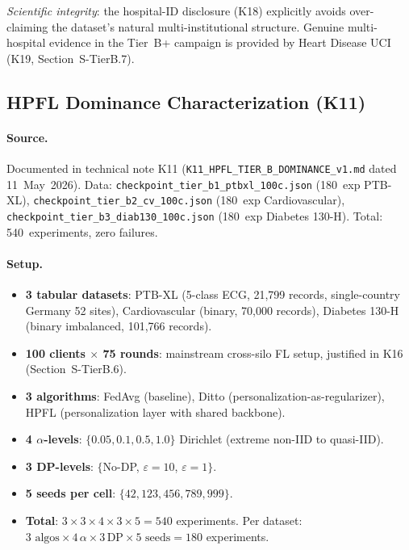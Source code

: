 \documentclass[conference]{IEEEtran}
\begin{document}
\emph{Scientific integrity}: the hospital-ID disclosure (K18) explicitly avoids over-claiming the dataset's natural multi-institutional structure. Genuine multi-hospital evidence in the Tier~B+ campaign is provided by Heart Disease UCI (K19, Section~S-TierB.7).

\subsection{HPFL Dominance Characterization (K11)}
\label{sec:tier_b_hpfl_dominance}

\paragraph{Source.} Documented in technical note K11 (\texttt{K11\_HPFL\_TIER\_B\_DOMINANCE\_v1.md} dated 11~May~2026). Data: \texttt{checkpoint\_tier\_b1\_ptbxl\_100c.json} (180~exp PTB-XL), \texttt{checkpoint\_tier\_b2\_cv\_100c.json} (180~exp Cardiovascular), \texttt{checkpoint\_tier\_b3\_diab130\_100c.json} (180~exp Diabetes 130-H). Total: 540~experiments, zero failures.

\paragraph{Setup.}
\begin{itemize}
\item \textbf{3 tabular datasets}: PTB-XL (5-class ECG, 21,799 records, single-country Germany 52 sites), Cardiovascular (binary, 70,000 records), Diabetes 130-H (binary imbalanced, 101,766 records).
\item \textbf{100 clients $\times$ 75 rounds}: mainstream cross-silo FL setup, justified in K16 (Section~S-TierB.6).
\item \textbf{3 algorithms}: FedAvg (baseline), Ditto (personalization-as-regularizer), HPFL (personalization layer with shared backbone).
\item \textbf{4 $\alpha$-levels}: $\{0.05, 0.1, 0.5, 1.0\}$ Dirichlet (extreme non-IID to quasi-IID).
\item \textbf{3 DP-levels}: $\{$No-DP, $\varepsilon{=}10$, $\varepsilon{=}1\}$.
\item \textbf{5 seeds per cell}: $\{42, 123, 456, 789, 999\}$.
\item \textbf{Total}: $3{\times}3{\times}4{\times}3{\times}5 = 540$ experiments. Per dataset: $3 \text{ algos} \times 4\,\alpha \times 3\,\text{DP} \times 5 \text{ seeds} = 180$ experiments.
\end{itemize}
\end{document}

